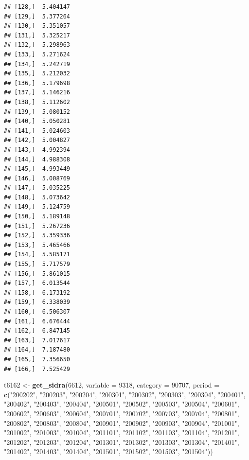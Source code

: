 \documentclass[
]{article}
\newenvironment{Shaded}{\begin{snugshade}}{\end{snugshade}}
\newcommand{\DataTypeTok}[1]{\textcolor[rgb]{0.13,0.29,0.53}{#1}}
\newcommand{\DecValTok}[1]{\textcolor[rgb]{0.00,0.00,0.81}{#1}}
\newcommand{\KeywordTok}[1]{\textcolor[rgb]{0.13,0.29,0.53}{\textbf{#1}}}
\newcommand{\NormalTok}[1]{#1}
\newcommand{\StringTok}[1]{\textcolor[rgb]{0.31,0.60,0.02}{#1}}
\begin{document}
\begin{verbatim}
## [128,]  5.404147
## [129,]  5.377264
## [130,]  5.351057
## [131,]  5.325217
## [132,]  5.298963
## [133,]  5.271624
## [134,]  5.242719
## [135,]  5.212032
## [136,]  5.179698
## [137,]  5.146216
## [138,]  5.112602
## [139,]  5.080152
## [140,]  5.050281
## [141,]  5.024603
## [142,]  5.004827
## [143,]  4.992394
## [144,]  4.988308
## [145,]  4.993449
## [146,]  5.008769
## [147,]  5.035225
## [148,]  5.073642
## [149,]  5.124759
## [150,]  5.189148
## [151,]  5.267236
## [152,]  5.359336
## [153,]  5.465466
## [154,]  5.585171
## [155,]  5.717579
## [156,]  5.861015
## [157,]  6.013544
## [158,]  6.173192
## [159,]  6.338039
## [160,]  6.506307
## [161,]  6.676444
## [162,]  6.847145
## [163,]  7.017617
## [164,]  7.187480
## [165,]  7.356650
## [166,]  7.525429
\end{verbatim}

\begin{Shaded}
\begin{Highlighting}[]
\NormalTok{t6162 <-}\StringTok{ }\KeywordTok{get_sidra}\NormalTok{(}\DecValTok{6612}\NormalTok{, }\DataTypeTok{variable =} \DecValTok{9318}\NormalTok{, }\DataTypeTok{category =} \DecValTok{90707}\NormalTok{, }\DataTypeTok{period =} \KeywordTok{c}\NormalTok{(}\StringTok{"200202"}\NormalTok{, }
    \StringTok{"200203"}\NormalTok{, }\StringTok{"200204"}\NormalTok{, }\StringTok{"200301"}\NormalTok{, }\StringTok{"200302"}\NormalTok{, }\StringTok{"200303"}\NormalTok{, }\StringTok{"200304"}\NormalTok{, }
    \StringTok{"200401"}\NormalTok{, }\StringTok{"200402"}\NormalTok{, }\StringTok{"200403"}\NormalTok{, }\StringTok{"200404"}\NormalTok{, }\StringTok{"200501"}\NormalTok{, }\StringTok{"200502"}\NormalTok{, }
    \StringTok{"200503"}\NormalTok{, }\StringTok{"200504"}\NormalTok{, }\StringTok{"200601"}\NormalTok{, }\StringTok{"200602"}\NormalTok{, }\StringTok{"200603"}\NormalTok{, }\StringTok{"200604"}\NormalTok{, }
    \StringTok{"200701"}\NormalTok{, }\StringTok{"200702"}\NormalTok{, }\StringTok{"200703"}\NormalTok{, }\StringTok{"200704"}\NormalTok{, }\StringTok{"200801"}\NormalTok{, }\StringTok{"200802"}\NormalTok{, }
    \StringTok{"200803"}\NormalTok{, }\StringTok{"200804"}\NormalTok{, }\StringTok{"200901"}\NormalTok{, }\StringTok{"200902"}\NormalTok{, }\StringTok{"200903"}\NormalTok{, }\StringTok{"200904"}\NormalTok{, }
    \StringTok{"201001"}\NormalTok{, }\StringTok{"201002"}\NormalTok{, }\StringTok{"201003"}\NormalTok{, }\StringTok{"201004"}\NormalTok{, }\StringTok{"201101"}\NormalTok{, }\StringTok{"201102"}\NormalTok{, }
    \StringTok{"201103"}\NormalTok{, }\StringTok{"201104"}\NormalTok{, }\StringTok{"201201"}\NormalTok{, }\StringTok{"201202"}\NormalTok{, }\StringTok{"201203"}\NormalTok{, }\StringTok{"201204"}\NormalTok{, }
    \StringTok{"201301"}\NormalTok{, }\StringTok{"201302"}\NormalTok{, }\StringTok{"201303"}\NormalTok{, }\StringTok{"201304"}\NormalTok{, }\StringTok{"201401"}\NormalTok{, }\StringTok{"201402"}\NormalTok{, }
    \StringTok{"201403"}\NormalTok{, }\StringTok{"201404"}\NormalTok{, }\StringTok{"201501"}\NormalTok{, }\StringTok{"201502"}\NormalTok{, }\StringTok{"201503"}\NormalTok{, }\StringTok{"201504"}\NormalTok{))}
\end{Highlighting}
\end{Shaded}
\end{document}
